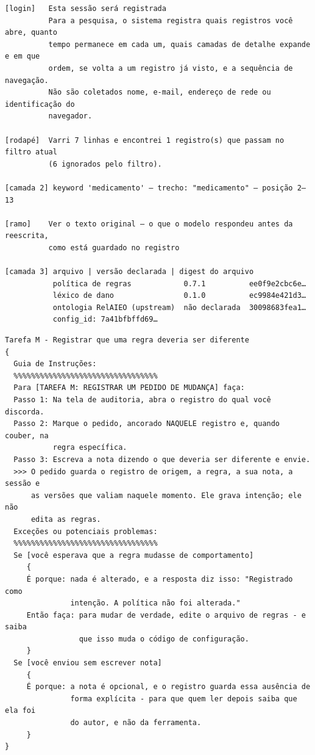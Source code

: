 \documentclass[10pt]{article}
\begin{document}
\begin{lstlisting}
[login]   Esta sessão será registrada
          Para a pesquisa, o sistema registra quais registros você abre, quanto
          tempo permanece em cada um, quais camadas de detalhe expande e em que
          ordem, se volta a um registro já visto, e a sequência de navegação.
          Não são coletados nome, e-mail, endereço de rede ou identificação do
          navegador.

[rodapé]  Varri 7 linhas e encontrei 1 registro(s) que passam no filtro atual
          (6 ignorados pelo filtro).

[camada 2] keyword 'medicamento' — trecho: "medicamento" — posição 2–13

[ramo]    Ver o texto original — o que o modelo respondeu antes da reescrita,
          como está guardado no registro

[camada 3] arquivo | versão declarada | digest do arquivo
           política de regras            0.7.1          ee0f9e2cbc6e…
           léxico de dano                0.1.0          ec9984e421d3…
           ontologia RelAIEO (upstream)  não declarada  30098683fea1…
           config_id: 7a41bfbffd69…
\end{lstlisting}

\begin{lstlisting}
Tarefa M - Registrar que uma regra deveria ser diferente
{
  Guia de Instruções:
  %%%%%%%%%%%%%%%%%%%%%%%%%%%%%%%%%
  Para [TAREFA M: REGISTRAR UM PEDIDO DE MUDANÇA] faça:
  Passo 1: Na tela de auditoria, abra o registro do qual você discorda.
  Passo 2: Marque o pedido, ancorado NAQUELE registro e, quando couber, na
           regra específica.
  Passo 3: Escreva a nota dizendo o que deveria ser diferente e envie.
  >>> O pedido guarda o registro de origem, a regra, a sua nota, a sessão e
      as versões que valiam naquele momento. Ele grava intenção; ele não
      edita as regras.
  Exceções ou potenciais problemas:
  %%%%%%%%%%%%%%%%%%%%%%%%%%%%%%%%%
  Se [você esperava que a regra mudasse de comportamento]
     {
     É porque: nada é alterado, e a resposta diz isso: "Registrado como
               intenção. A política não foi alterada."
     Então faça: para mudar de verdade, edite o arquivo de regras - e saiba
                 que isso muda o código de configuração.
     }
  Se [você enviou sem escrever nota]
     {
     É porque: a nota é opcional, e o registro guarda essa ausência de
               forma explícita - para que quem ler depois saiba que ela foi
               do autor, e não da ferramenta.
     }
}
\end{lstlisting}
\end{document}
